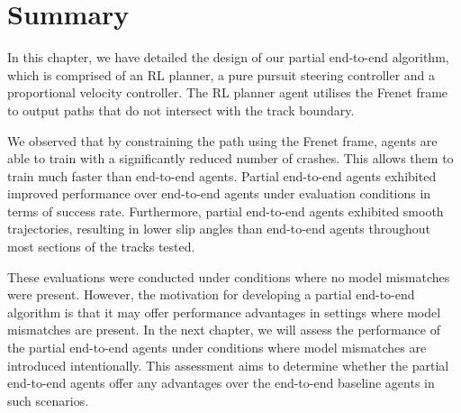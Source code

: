 %     


\section{Summary}

In this chapter, we have detailed the design of our partial end-to-end algorithm, which is comprised of an RL planner, a pure pursuit steering controller and a proportional velocity controller.
The RL planner agent utilises the Frenet frame to output paths that do not intersect with the track boundary.

We observed that by constraining the path using the Frenet frame, agents are able to train with a significantly reduced number of crashes.
This allows them to train much faster than end-to-end agents.
Partial end-to-end agents exhibited improved performance over end-to-end agents under evaluation conditions in terms of success rate.
Furthermore, partial end-to-end agents exhibited smooth trajectories, resulting in lower slip angles than end-to-end agents throughout most sections of the tracks tested.


These evaluations were conducted under conditions where no model mismatches were present.
However, the motivation for developing a partial end-to-end algorithm is that it may offer performance advantages in settings where model mismatches are present.
In the next chapter, we will assess the performance of the partial end-to-end agents under conditions where model mismatches are introduced intentionally. 
This assessment aims to determine whether the partial end-to-end agents offer any advantages over the end-to-end baseline agents in such scenarios.


